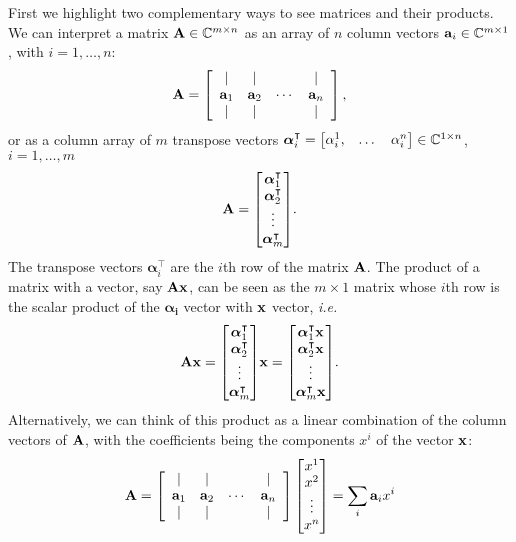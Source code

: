 \documentclass{article}
\begin{document}
First we highlight two complementary ways to see matrices and their products. We can interpret a matrix $\vb{A}\in \mathbb{C}^{m\times n}$ as an array of $n$ column vectors $\vb{a}_i\in\mathbb{C}^{m\times 1}$,  with $i=1,\dots,n$:
\begin{equation}
   \vb{A}=\left[\begin{array}{cccc}
    \mid & \mid & & \mid \\
    \vb{a}_{1} & \vb{a}_{2} & \cdots & \vb{a}_{n} \\
    \mid & \mid & & \mid
    \end{array}\right],
\end{equation}
or as a column array of $m$ transpose vectors $\boldsymbol{\alpha}_i^\intercal=\mqty[\alpha_i^1, & \dots & \alpha_i^n]\in\mathbb{C}^{1\times n}$, $i=1,\dots, m$
\begin{equation}
    \vb{A} = \mqty[\boldsymbol{\alpha}_1^\intercal \\ \boldsymbol{\alpha}_2^\intercal \\ \vdots \\ \boldsymbol{\alpha}_m^\intercal].
\end{equation}
The transpose vectors $\boldsymbol{\alpha}_i^\intercal$ are the $i$th row of the matrix $\vb{A}$.
The product of a matrix with a vector, say $\vb{Ax}$,  can be seen as the $m\times 1$ matrix whose $i$th row is the scalar product of the $\boldsymbol{\alpha_i}$ vector with $\vb{x}$ vector, \textit{i.e.} 
\begin{equation}
    \vb{Ax} = \mqty[\boldsymbol{\alpha}_1^\intercal \\ \boldsymbol{\alpha}_2^\intercal \\ \vdots \\ \boldsymbol{\alpha}_m^\intercal] \vb{ x} = \mqty[\boldsymbol{\alpha}_1^\intercal \vb{x}\\ \boldsymbol{\alpha}_2^\intercal \vb{x}\\ \vdots \\ \boldsymbol{\alpha}_m^\intercal\vb{x}].
\end{equation}
Alternatively, we can think of this product as a linear combination of the column vectors of $\vb{A}$, with the coefficients being the components $x^i$ of the vector $\vb{x}$:
\begin{equation}
   \vb{A}=\left[\begin{array}{cccc}
    \mid & \mid & & \mid \\
    \vb{a}_{1} & \vb{a}_{2} & \cdots & \vb{a}_{n} \\
    \mid & \mid & & \mid
    \end{array}\right]\mqty[x^1 \\ x^2 \\ \vdots \\ x^n] = \sum_i \vb{a}_i x^i
\end{equation}
\end{document}
